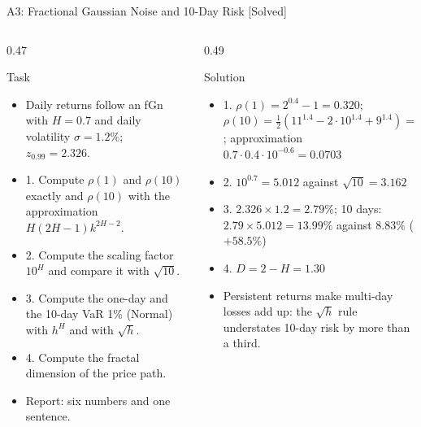 \begin{frame}{A3: Fractional Gaussian Noise and 10-Day Risk [Solved]}
\itemsize{\scriptsize}
\begin{columns}[T]
\begin{column}{0.47\textwidth}
\begin{block}{Task}
\begin{itemize}
    \item Daily returns follow an fGn with $H = 0.7$ and daily volatility $\sigma = 1.2\%$; $z_{0.99} = 2.326$.
    \item 1. Compute $\rho(1)$ and $\rho(10)$ exactly and $\rho(10)$ with the approximation $H(2H - 1)k^{2H - 2}$.
    \item 2. Compute the scaling factor $10^H$ and compare it with $\sqrt{10}$.
    \item 3. Compute the one-day and the 10-day VaR 1\% (Normal) with $h^H$ and with $\sqrt{h}$.
    \item 4. Compute the fractal dimension of the price path.
    \item Report: six numbers and one sentence.
\end{itemize}
\end{block}
\end{column}
\begin{column}{0.49\textwidth}
\begin{exampleblock}{Solution}
\begin{itemize}
    \item 1. $\rho(1) = 2^{0.4} - 1 = 0.320$; $\rho(10) = \tfrac12(11^{1.4} - 2 \cdot 10^{1.4} + 9^{1.4}) = 0.0704$; approximation $0.7 \cdot 0.4 \cdot 10^{-0.6} = 0.0703$
    \item 2. $10^{0.7} = 5.012$ against $\sqrt{10} = 3.162$
    \item 3. $2.326 \times 1.2 = 2.79\%$; 10 days: $2.79 \times 5.012 = 13.99\%$ against $8.83\%$ ($+58.5\%$)
    \item 4. $D = 2 - H = 1.30$
    \item Persistent returns make multi-day losses add up: the $\sqrt{h}$ rule understates 10-day risk by more than a third.
\end{itemize}
\end{exampleblock}
\end{column}
\end{columns}
\end{frame}


